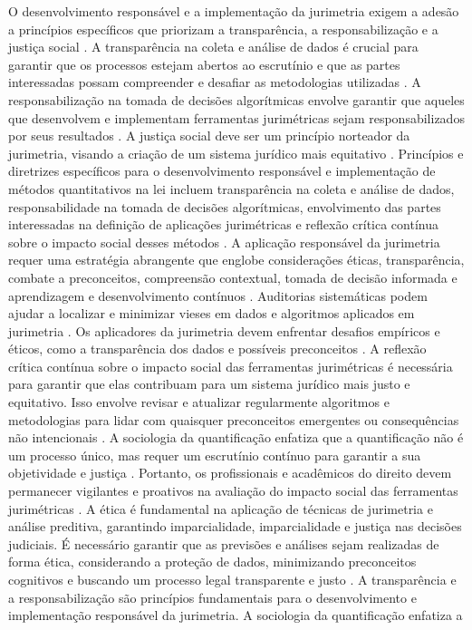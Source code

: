O desenvolvimento responsável e a implementação da jurimetria exigem a adesão a princípios específicos que priorizam a transparência, a responsabilização e a justiça social \cite{10.1590/dados.2022.65.3.267,10.1007/978-3-319-44000-215}. A transparência na coleta e análise de dados é crucial para garantir que os processos estejam abertos ao escrutínio e que as partes interessadas possam compreender e desafiar as metodologias utilizadas \cite{10.1590/dados.2022.65.3.267,10.1007/978-3-319-44000-215} . A responsabilização na tomada de decisões algorítmicas envolve garantir que aqueles que desenvolvem e implementam ferramentas jurimétricas sejam responsabilizados por seus resultados \cite{10.1590/dados.2022.65.3.267,10.1007/978-3-319-44000-215}. A justiça social deve ser um princípio norteador da jurimetria, visando a criação de um sistema jurídico mais equitativo \cite{10.1590/dados.2022.65.3.267,10.1007/978-3-319-44000-215}. Princípios e diretrizes específicos para o desenvolvimento responsável e implementação de métodos quantitativos na lei incluem transparência na coleta e análise de dados, responsabilidade na tomada de decisões algorítmicas, envolvimento das partes interessadas na definição de aplicações jurimétricas e reflexão crítica contínua sobre o impacto social desses métodos \cite {10.1057/s41599-020-00557-0}. A aplicação responsável da jurimetria requer uma estratégia abrangente que englobe considerações éticas, transparência, combate a preconceitos, compreensão contextual, tomada de decisão informada e aprendizagem e desenvolvimento contínuos \cite{10.1590/dados.2022.65.3.267,1023071190721}. Auditorias sistemáticas podem ajudar a localizar e minimizar vieses em dados e algoritmos aplicados em jurimetria \cite{10.1590/dados.2022.65.3.267,1023071190721}. Os aplicadores da jurimetria devem enfrentar desafios empíricos e éticos, como a transparência dos dados e possíveis preconceitos \cite{10.1590/dados.2022.65.3.267,1023071190721}. A reflexão crítica contínua sobre o impacto social das ferramentas jurimétricas é necessária para garantir que elas contribuam para um sistema jurídico mais justo e equitativo. Isso envolve revisar e atualizar regularmente algoritmos e metodologias para lidar com quaisquer preconceitos emergentes ou consequências não intencionais \cite{10.1007/s11186-021-09453-1,1023071190721}. A sociologia da quantificação enfatiza que a quantificação não é um processo único, mas requer um escrutínio contínuo para garantir a sua objetividade e justiça \cite{10.1007/s11186-021-09453-1,1023071190721}. Portanto, os profissionais e acadêmicos do direito devem permanecer vigilantes e proativos na avaliação do impacto social das ferramentas jurimétricas \cite{10.1007/s11186-021-09453-1,1023071190721}. A ética é fundamental na aplicação de técnicas de jurimetria e análise preditiva, garantindo imparcialidade, imparcialidade e justiça nas decisões judiciais. É necessário garantir que as previsões e análises sejam realizadas de forma ética, considerando a proteção de dados, minimizando preconceitos cognitivos e buscando um processo legal transparente e justo \cite{101007s1102402209481w}. A transparência e a responsabilização são princípios fundamentais para o desenvolvimento e implementação responsável da jurimetria. A sociologia da quantificação enfatiza a 